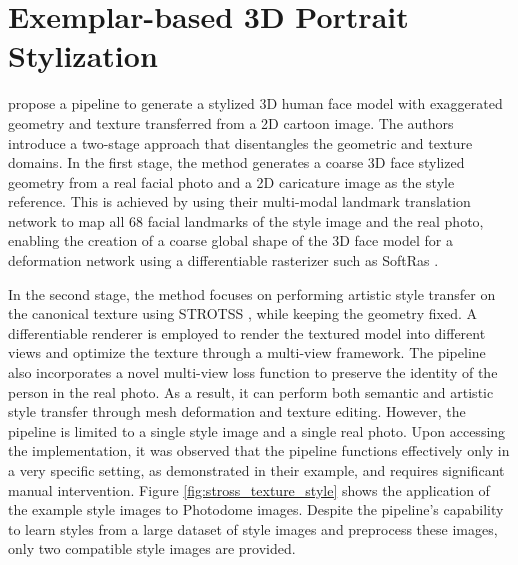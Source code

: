 \section{Exemplar-based 3D Portrait Stylization}
\textcite{Han.2021} propose a pipeline to generate a stylized 3D human face model with exaggerated geometry and texture transferred from a 2D cartoon image. The authors introduce a two-stage approach that disentangles the geometric and texture domains. In the first stage, the method generates a coarse 3D face stylized geometry from a real facial photo and a 2D caricature image as the style reference. This is achieved by using their multi-modal landmark translation network to map all 68 facial landmarks of the style image and the real photo, enabling the creation of a coarse global shape of the 3D face model for a deformation network using a differentiable rasterizer such as SoftRas \citep{Liu.2019}. 

In the second stage, the method focuses on performing artistic style transfer on the canonical texture using STROTSS \citep{Kolkin.2019}, while keeping the geometry fixed. A differentiable renderer is employed to render the textured model into different views and optimize the texture through a multi-view framework. The pipeline also incorporates a novel multi-view loss function to preserve the identity of the person in the real photo. As a result, it can perform both semantic and artistic style transfer through mesh deformation and texture editing. However, the pipeline is limited to a single style image and a single real photo. Upon accessing the implementation, it was observed that the pipeline functions effectively only in a very specific setting, as demonstrated in their example, and requires significant manual intervention. Figure \ref{fig:stross_texture_style} shows the application of the example style images to Photodome images. Despite the pipeline's capability to learn styles from a large dataset of style images and preprocess these images, only two compatible style images are provided.

